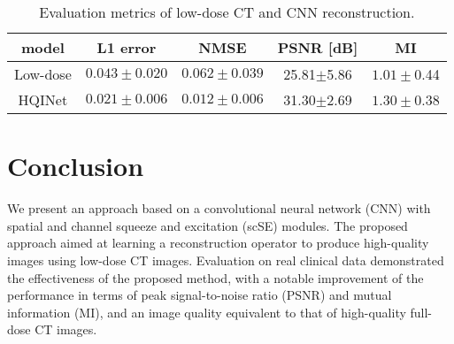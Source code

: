 \documentclass[conference]{IEEEtran}
\begin{document}
\begin{table}[!t]
\renewcommand{\arraystretch}{1.25}
\setlength{\tabcolsep}{1.4mm}
\caption{Evaluation metrics of low-dose CT and CNN reconstruction.}
\label{table_test}
\centering
\begin{tabular}{c c c c c}
\toprule
model & L1 error & NMSE & PSNR [dB] & MI \\
\midrule
Low-dose & $0.043\pm0.020$ & $0.062\pm0.039$ & 25.81$\pm$5.86 & $1.01\pm$0.44 \\
HQINet & $0.021 \pm 0.006$ & $0.012\pm0.006$ & 31.30$\pm$2.69 & $1.30\pm$0.38 \\
\bottomrule
\end{tabular}
\end{table}

\section{Conclusion}

We present an approach based on a convolutional neural network (CNN) with spatial and channel squeeze and excitation (scSE) modules. The proposed approach aimed at learning a reconstruction operator to produce high-quality images using low-dose CT images. Evaluation on real clinical data demonstrated the effectiveness of the proposed method, with a notable improvement of the performance in terms of peak signal-to-noise ratio (PSNR) and mutual information (MI), and an image quality equivalent to that of high-quality full-dose CT images.



\ifCLASSOPTIONcaptionsoff
  \newpage
\fi
\balance


\end{document}

